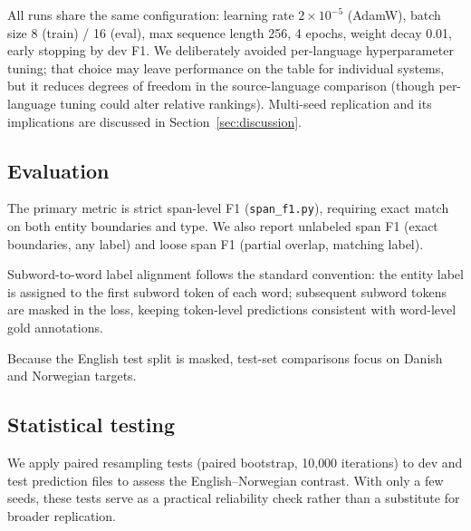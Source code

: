 All runs share the same configuration: learning rate $2\times10^{-5}$ (AdamW), batch size 8 (train) / 16 (eval), max sequence length 256, 4 epochs, weight decay 0.01, early stopping by dev F1. We deliberately avoided per-language hyperparameter tuning; that choice may leave performance on the table for individual systems, but it reduces degrees of freedom in the source-language comparison (though per-language tuning could alter relative rankings). Multi-seed replication and its implications are discussed in Section~\ref{sec:discussion}.

\subsection{Evaluation}

The primary metric is strict span-level F1 (\texttt{span\_f1.py}), requiring exact match on both entity boundaries and type. We also report unlabeled span F1 (exact boundaries, any label) and loose span F1 (partial overlap, matching label).

Subword-to-word label alignment follows the standard convention: the entity label is assigned to the first subword token of each word; subsequent subword tokens are masked in the loss, keeping token-level predictions consistent with word-level gold annotations.

Because the English test split is masked, test-set comparisons focus on Danish and Norwegian targets.

\subsection{Statistical testing}

We apply paired resampling tests (paired bootstrap, 10{,}000 iterations) to dev and test prediction files to assess the English--Norwegian contrast. With only a few seeds, these tests serve as a practical reliability check rather than a substitute for broader replication.
